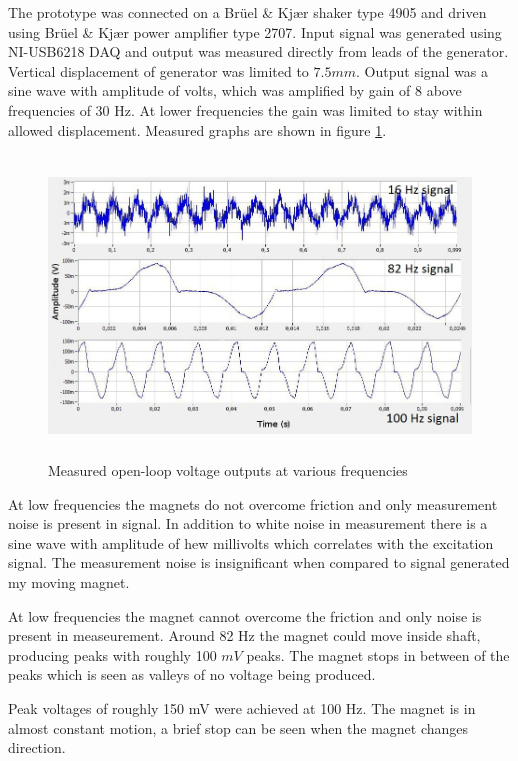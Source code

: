 The prototype was connected on a  Brüel & Kjær shaker type 4905 and driven using  Brüel & Kjær power amplifier type 2707. Input signal was generated using NI-USB6218 DAQ and output was measured directly from leads of the generator. Vertical displacement of generator was limited to $7.5 mm$. Output signal was a sine wave with amplitude of  volts, which was amplified by gain of 8 above frequencies of 30 Hz. At lower frequencies the gain was limited to stay within allowed displacement. Measured graphs are shown in figure \ref{fiq:lg_proto_results}.

\begin{figure}[h]
\begin{center}
  \includegraphics[height=8cm]{images/own_measurement/lg_proto.jpg}
  \end{center}
  \caption{\label{fiq:lg_proto_results} Measured open-loop voltage outputs at various frequencies}
\end{figure}

At low frequencies the magnets do not overcome friction and only measurement noise is present in signal. In addition to white noise in measurement there is a sine wave with amplitude of hew millivolts which correlates with the excitation signal. The measurement noise is insignificant when compared to signal generated my moving magnet. 

At low frequencies the magnet cannot overcome the friction and only noise is present in measeurement. Around 82 Hz the magnet could move inside shaft, producing peaks with roughly 100 $mV$ peaks. The magnet stops in between of the peaks which is seen as valleys of no voltage being produced. 

Peak voltages of roughly 150 mV were achieved at 100 Hz. The magnet is in almost constant motion, a brief stop can be seen when the magnet changes direction. 

